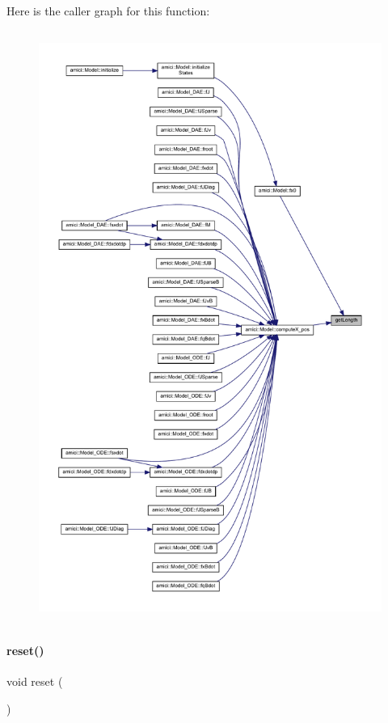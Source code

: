 Here is the caller graph for this function\+:
\nopagebreak
\begin{figure}[H]
\begin{center}
\leavevmode
\includegraphics[height=550pt]{classamici_1_1_ami_vector_a5f00d4dc3e7866d193ce926f35542801_icgraph}
\end{center}
\end{figure}
\mbox{\label{classamici_1_1_ami_vector_ad20897c5c8bd47f5d4005989bead0e55}} 
\paragraph{\texorpdfstring{reset()}{reset()}}
{\footnotesize\ttfamily void reset (\begin{DoxyParamCaption}{ }\end{DoxyParamCaption})}

